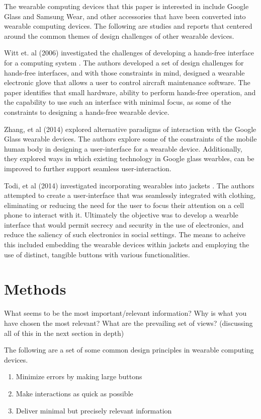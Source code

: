 \documentclass[12pt]{article}
\begin{document}
The wearable computing devices that this paper is interested in include Google Glass and Samsung Wear, and other accessories that have been converted into wearable computing devices. The following are studies and reports that centered around the common themes of design challenges of other wearable devices.

Witt et. al (2006) investigated the challenges of developing a hands-free interface for a computing system \cite{witt}. The authors developed a set of design challenges for hands-free interfaces, and with those constraints in mind, designed a wearable electronic glove that allows a user to control aircraft maintenance software. The paper identifies that small hardware, ability to perform hands-free operation, and the capability to use such an interface with minimal focus, as some of the constraints to designing a hands-free wearable device.

Zhang, et al (2014) explored alternative paradigms of interaction with the Google Glass wearable devices. The authors explore some of the constraints of the mobile human body in designing a user-interface for a wearable device. Additionally, they explored ways in which existing technology in Google glass wearbles, can be improved to further support seamless user-interaction. 

Todi, et al (2014) investigated incorporating wearables into jackets \cite{todi}. The authors attempted to create a user-interface that was seamlessly integrated with clothing, eliminating or reducing the need for the user to focus their attention on a cell phone to interact with it. Ultimately the objective was to develop a wearble interface that would permit secrecy and security in the use of electronics, and reduce the saliency of such electronics in social settings.  The means to acheive this included embedding the wearable devices within jackets and employing the use of distinct, tangible buttons with various functionalities.

\section{Methods} 
What seems to be the most important/relevant information? Why is what you have chosen the most relevant? What are the prevailing set of views? (discussing all of this in the next section in depth) 

The following are a set of some common design principles in wearable computing devices.

\begin{enumerate}
\item{Minimize errors by making large buttons}
\item{Make interactions as quick as possible}
\item Deliver minimal but precisely relevant information
\end{enumerate}
\end{document}
